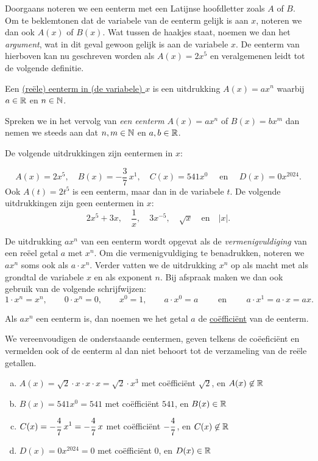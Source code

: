 \documentclass{ximera}
\begin{document}
Doorgaans noteren we een eenterm met een Latijnse hoofdletter zoals $A$ of $B$. Om te beklemtonen dat de variabele van de eenterm gelijk is aan $x$, noteren we dan ook $A(x)$ of $B(x)$. Wat tussen de haakjes staat, noemen we dan het {\em argument}, wat in dit geval gewoon gelijk is aan de variabele $x$. De eenterm van hierboven kan nu geschreven worden als $A(x) = 2x^5$ en veralgemenen leidt tot de volgende definitie.

\begin{definition} 
Een \underline{(re\"ele) eenterm in (de variabele) $x$} is een uitdrukking $A(x) = ax^n$ waarbij $a \in \mathbb{R}$ en $n \in \mathbb{N}$. 
\end{definition} 

Spreken we in het vervolg van {\em een eenterm} $A(x) = ax^n$ of $B(x) = bx^m$ dan nemen we steeds aan dat $n,m\in \mathbb{N}$ en $a,b\in \mathbb{R}$.

\begin{example} 
De volgende uitdrukkingen zijn eentermen in $x$:
  
\[
A(x) = 2x^5, \quad B(x) = -\frac{3}{7}\,x^1, \quad C(x) = 541x^0 \quad \text{ en } \quad D(x) = 0x^{2024}.
\]
Ook $A(t) = 2t^5$ is een eenterm, maar dan in de variabele $t$. De volgende uitdrukkingen zijn geen eentermen in $x$:
\[
2x^5+3x, \quad \frac{1}{x}, \quad 3x^{-5}, \quad \sqrt{x} \quad \text{en} \quad \left|x\right|.
\] 
\end{example} 

De uitdrukking $ax^n$ van een eenterm wordt opgevat als de {\em vermenigvuldiging} van een re\"eel getal $a$ met $x^n$. Om die vermenigvuldiging te benadrukken, noteren we $ax^n$ soms ook als $a \cdot x^n$. Verder vatten we de uitdrukking $x^n$ op als macht met als grondtal de variabele $x$ en als exponent $n$. Bij afspraak maken we dan ook gebruik van de volgende schrijfwijzen:
\[
1\cdot x^n = x^n, \qquad
0\cdot x^n = 0, \qquad  
x^0 = 1, \qquad 
a\cdot x^0 = a \qquad \text{ en } \qquad 
a\cdot x^1 = a \cdot x = ax.
\]

Als $ax^n$ een eenterm is, dan noemen we het getal $a$ de \underline{co\"effici\"ent} van de eenterm.

\begin{example} 
We vereenvoudigen de onderstaande eentermen, geven telkens de co\"eefici\"ent en vermelden ook of de eenterm al dan niet behoort tot de verzameling van de re\"ele getallen.
\begin{enumerate}[(a)]
\item
$A(x) = \sqrt{2}\cdot x \cdot x \cdot x = \sqrt{2}\cdot x^3$ met co\"effici\"ent $\sqrt{2}$, en $A(x) \not\in \mathbb{R}$
\item
$B(x) = 541x^0 = 541$ met co\"effici\"ent $541$, en $B(x) \in \mathbb{R}$ 
\item
$\displaystyle C(x) = -\frac{4}{7}\,x^1 = -\frac{4}{7}\,x$ met co\"effici\"ent $\displaystyle -\frac{4}{7}$, en $C(x) \not\in \mathbb{R}$
\item
$D(x) = 0 x^{2024} = 0$ met co\"effici\"ent $0$, en $D(x) \in \mathbb{R}$ 
\end{enumerate}
\end{example} 
\end{document}
